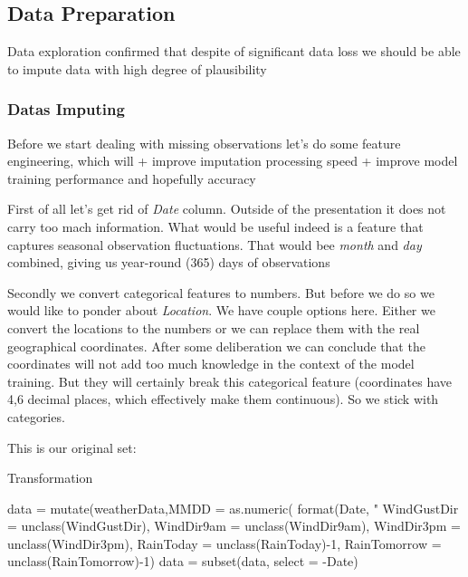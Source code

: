 \hypertarget{data-preparation}{%
\subsection{Data Preparation}\label{data-preparation}}

Data exploration confirmed that despite of significant data loss we
should be able to impute data with high degree of plausibility

\hypertarget{datas-imputing}{%
\subsubsection{Datas Imputing}\label{datas-imputing}}

Before we start dealing with missing observations let's do some feature
engineering, which will + improve imputation processing speed + improve
model training performance and hopefully accuracy

First of all let's get rid of \emph{Date} column. Outside of the
presentation it does not carry too mach information. What would be
useful indeed is a feature that captures seasonal observation
fluctuations. That would bee \emph{month} and \emph{day} combined,
giving us year-round (365) days of observations

Secondly we convert categorical features to numbers. But before we do so
we would like to ponder about \emph{Location}. We have couple options
here. Either we convert the locations to the numbers or we can replace
them with the real geographical coordinates. After some deliberation we
can conclude that the coordinates will not add too much knowledge in the
context of the model training. But they will certainly break this
categorical feature (coordinates have 4,6 decimal places, which
effectively make them continuous). So we stick with categories.

This is our original set:

Transformation

\begin{Schunk}
\begin{Sinput}
data = mutate(weatherData,MMDD = as.numeric( format(Date, "%
              WindGustDir = unclass(WindGustDir), 
              WindDir9am = unclass(WindDir9am), WindDir3pm = unclass(WindDir3pm),
              RainToday = unclass(RainToday)-1, RainTomorrow = unclass(RainTomorrow)-1)
data =  subset(data, select = -Date)
\end{Sinput}
\end{Schunk}

